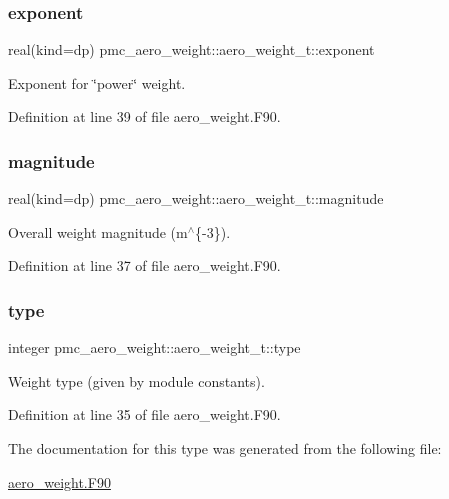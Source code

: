 \subsubsection{\texorpdfstring{exponent}{exponent}}
{\footnotesize\ttfamily real(kind=dp) pmc\+\_\+aero\+\_\+weight\+::aero\+\_\+weight\+\_\+t\+::exponent}



Exponent for \char`\"{}power\char`\"{} weight. 



Definition at line 39 of file aero\+\_\+weight.\+F90.

\mbox{\label{structpmc__aero__weight_1_1aero__weight__t_a9d092c751e4ac7b33468e2e5346621f6}} 
\subsubsection{\texorpdfstring{magnitude}{magnitude}}
{\footnotesize\ttfamily real(kind=dp) pmc\+\_\+aero\+\_\+weight\+::aero\+\_\+weight\+\_\+t\+::magnitude}



Overall weight magnitude (m$^\wedge$\{-\/3\}). 



Definition at line 37 of file aero\+\_\+weight.\+F90.

\mbox{\label{structpmc__aero__weight_1_1aero__weight__t_a05e0f83cc68670b5af437fcef89d358f}} 
\subsubsection{\texorpdfstring{type}{type}}
{\footnotesize\ttfamily integer pmc\+\_\+aero\+\_\+weight\+::aero\+\_\+weight\+\_\+t\+::type}



Weight type (given by module constants). 



Definition at line 35 of file aero\+\_\+weight.\+F90.



The documentation for this type was generated from the following file\+:\begin{DoxyCompactItemize}
\item 
\mbox{\hyperlink{aero__weight_8_f90}{aero\+\_\+weight.\+F90}}\end{DoxyCompactItemize}
